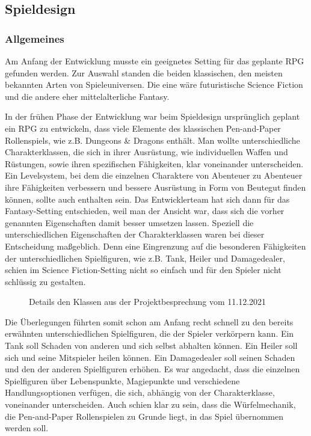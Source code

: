 

\subsection{Spieldesign}



\subsubsection{Allgemeines} Am Anfang der Entwicklung musste ein geeignetes Setting für das geplante RPG gefunden werden. Zur Auswahl standen die beiden klassischen, den meisten bekannten Arten von Spieleuniversen. Die eine wäre futuristische Science Fiction und die andere eher mittelalterliche Fantasy. 

In der frühen Phase der Entwicklung war beim Spieldesign ursprünglich geplant ein RPG zu entwickeln, dass viele Elemente des klassischen Pen-and-Paper Rollenspiels, wie z.B. Dungeons \& Dragons enthält. Man wollte unterschiedliche Charakterklassen, die sich in ihrer Ausrüstung, wie individuellen Waffen und Rüstungen, sowie ihren spezifischen Fähigkeiten, klar voneinander unterscheiden. Ein Levelsystem, bei dem die einzelnen Charaktere von Abenteuer zu Abenteuer ihre Fähigkeiten verbessern und bessere Ausrüstung in Form von Beutegut finden können, sollte auch enthalten sein. Das Entwicklerteam hat sich dann für das Fantasy-Setting entschieden, weil man der Ansicht war, dass sich die vorher genannten Eigenschaften damit besser umsetzen lassen. Speziell die unterschiedlichen Eigenschaften der Charakterklassen waren bei dieser Entscheidung maßgeblich. Denn eine Eingrenzung auf die besonderen Fähigkeiten der unterschiedlichen Spielfiguren, wie z.B. Tank, Heiler und Damagedealer, schien im Science Fiction-Setting nicht so einfach und für den Spieler nicht schlüssig zu gestalten.

\begin{figure}[H]
    \centering
    \caption{Details den Klassen aus der Projektbesprechung vom 11.12.2021}
    \label{fig:2021-12-11-Projekt-Besprechung-Klassenbeschreibung}
\end{figure}


Die Überlegungen führten somit schon am Anfang recht schnell zu den bereits erwähnten unterschiedlichen Spielfiguren, die der Spieler verkörpern kann. Ein Tank soll Schaden von anderen und sich selbst abhalten können. Ein Heiler soll sich und seine Mitspieler heilen können. Ein Damagedealer soll seinen Schaden und den der anderen Spielfiguren erhöhen. Es war angedacht, dass die einzelnen Spielfiguren über Lebenspunkte, Magiepunkte und verschiedene Handlungsoptionen verfügen, die sich, abhängig von der Charakterklasse, voneinander unterscheiden. Auch schien klar zu sein, dass die Würfelmechanik, die Pen-and-Paper Rollenspielen zu Grunde liegt, in das Spiel übernommen werden soll.


